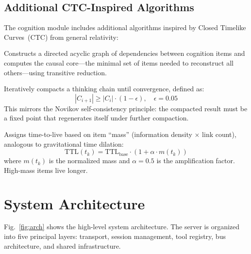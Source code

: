 \documentclass[journal,10pt]{IEEEtran}
\begin{document}
\subsection{Additional CTC-Inspired Algorithms}
\label{sec:ctc}

The cognition module includes additional algorithms inspired by Closed Timelike Curves~(CTC) from general relativity:

\begin{description}[nosep,style=unboxed,leftmargin=0pt,font=\normalfont\itshape]
\item[Causal DAG analysis.] Constructs a directed acyclic graph of dependencies between cognition items and computes the causal core---the minimal set of items needed to reconstruct all others---using transitive reduction.

\item[Fixed-point detection.] Iteratively compacts a thinking chain until convergence, defined as:
\begin{equation}
|C_{i+1}| \geq |C_i| \cdot (1 - \epsilon), \quad \epsilon = 0.05
\label{eq:fixedpoint}
\end{equation}
This mirrors the Novikov self-consistency principle: the compacted result must be a fixed point that regenerates itself under further compaction.

\item[Gravitational TTL.] Assigns time-to-live based on item ``mass'' (information density $\times$ link count), analogous to gravitational time dilation:
\begin{equation}
\text{TTL}(t_k) = \text{TTL}_{\text{base}} \cdot \left(1 + \alpha \cdot m(t_k)\right)
\label{eq:gttl}
\end{equation}
where $m(t_k)$ is the normalized mass and $\alpha = 0.5$ is the amplification factor. High-mass items live longer.
\end{description}

\section{System Architecture}
\label{sec:arch}

Fig.~\ref{fig:arch} shows the high-level system architecture. The server is organized into five principal layers: transport, session management, tool registry, bus architecture, and shared infrastructure.
\end{document}
